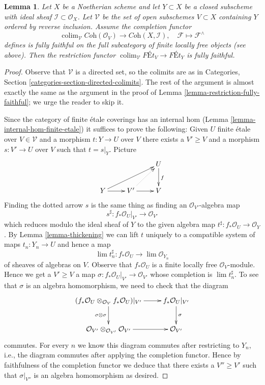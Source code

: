 \documentclass{stacks-project}
\theoremstyle{plain}
\newtheorem{lemma}[subsection]{Lemma}
\theoremstyle{definition}
\theoremstyle{remark}
\numberwithin{equation}{subsection}
\def\lim{\mathop{\mathrm{lim}}\nolimits}
\def\colim{\mathop{\mathrm{colim}}\nolimits}
\begin{document}
\begin{lemma}
\label{lemma-restriction-fully-faithful-general}
Let $X$ be a Noetherian scheme and let $Y \subset X$ be a closed subscheme
with ideal sheaf $\mathcal{I} \subset \mathcal{O}_X$.
Let $\mathcal{V}$ be the set of open subschemes $V \subset X$ containing $Y$
ordered by reverse inclusion. Assume the completion functor
$$
\colim_\mathcal{V} \textit{Coh}(\mathcal{O}_V)
\longrightarrow
\textit{Coh}(X, \mathcal{I}),
\quad
\mathcal{F} \longmapsto \mathcal{F}^\wedge
$$
defines is fully faithful on the full subcategory of
finite locally free objects (see above).
Then the restriction functor
$\colim_\mathcal{V} \textit{F\'Et}_V \to \textit{F\'Et}_Y$
is fully faithful.
\end{lemma}

\begin{proof}
Observe that $\mathcal{V}$ is a directed set, so the colimits are
as in Categories, Section \ref{categories-section-directed-colimits}.
The rest of the argument is almost exactly the same as the argument
in the proof of Lemma \ref{lemma-restriction-fully-faithful}; we urge
the reader to skip it.

\medskip\noindent
Since the category of finite \'etale coverings has an
internal hom (Lemma \ref{lemma-internal-hom-finite-etale})
it suffices to prove the following: Given $U$ finite \'etale over
$V \in \mathcal{V}$
and a morphism $t : Y \to U$ over $V$ there exists a $V' \geq V$
and a morphism $s : V' \to U$ over $V$ such that $t = s|_Y$. Picture
$$
\xymatrix{
& & U \ar[d]^f \\
Y \ar[r] \ar[rru] & V' \ar@{..>}[ru] \ar[r] & V
}
$$
Finding the dotted arrow $s$ is the same thing as finding an
$\mathcal{O}_{V'}$-algebra map
$$
s^\sharp : f_*\mathcal{O}_U|_{V'} \longrightarrow \mathcal{O}_{V'}
$$
which reduces modulo the ideal sheaf of $Y$ to the given algebra map
$t^\sharp : f_*\mathcal{O}_U \to \mathcal{O}_Y$.
By Lemma \ref{lemma-thickening} we can lift $t$ uniquely to a compatible
system of maps $t_n : Y_n \to U$ and hence a map
$$
\lim t_n^\sharp : f_*\mathcal{O}_U \longrightarrow \lim \mathcal{O}_{Y_n}
$$
of sheaves of algebras on $V$.
Observe that $f_*\mathcal{O}_U$ is a finite locally free
$\mathcal{O}_V$-module. Hence we get a $V' \geq V$ a map
$\sigma : f_*\mathcal{O}_U|_{V'} \to \mathcal{O}_{V'}$
whose completion is $\lim t_n^\sharp$.
To see that $\sigma$ is an algebra homomorphism, we need to check
that the diagram
$$
\xymatrix{
(f_*\mathcal{O}_U \otimes_{\mathcal{O}_V} f_*\mathcal{O}_U)|_{V'}
\ar[r] \ar[d]_{\sigma \otimes \sigma} &
f_*\mathcal{O}_U|_{V'} \ar[d]^\sigma \\
\mathcal{O}_{V'} \otimes_{\mathcal{O}_{V'}} \mathcal{O}_{V'} \ar[r] &
\mathcal{O}_{V'}
}
$$
commutes. For every $n$ we know this diagram commutes after restricting
to $Y_n$, i.e., the diagram commutes after applying the completion functor.
Hence by faithfulness of the completion functor
we deduce that there exists a $V'' \geq V'$ such that
$\sigma|_{V''}$ is an algebra homomorphism as desired.
\end{proof}
\end{document}
